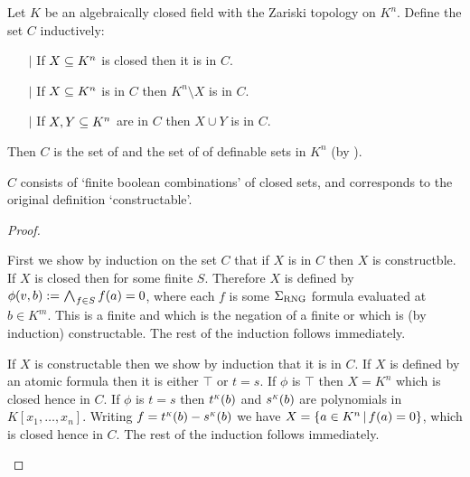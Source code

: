 \begin{prop}[Constructable]
    Let $K$ be an algebraically closed field with the Zariski topology on $K^n$.
    Define the set $C$ inductively:
    \begin{itemize}
        \item[$\vert$] If $X \subseteq K^n$ is closed then it is in $C$.
        \item[$\vert$] If $X \subseteq K^n$ is in $C$ then $K^n \setminus X$
        is in $C$. 
        \item[$\vert$] If $X,Y \subseteq K^n$ are in $C$ then $X \cup Y$
        is in $C$. 
    \end{itemize}
    Then $C$ is the set of  
    and  
    the set of of definable sets in $K^n$
    (by ).

    $C$ consists of `finite boolean combinations' of closed sets, 
    and corresponds to the original definition `constructable'.
\end{prop}
\begin{proof}
    \begin{forward}
        First we show by induction on the set $C$ 
        that if $X$ is in $C$ then $X$ is constructble.
        If $X$ is closed then 
         for some 
        finite $S$. 
        Therefore $X$ is defined by 
        $\phi(v,b) := \bigand{f \in S}{} f(a) = 0$,
        where each $f$ is some $\Sigma_{\mathrm{RNG}}$ formula evaluated at $b \in K^m$.
        This is a finite and which is the negation of a finite or which is 
        (by induction) constructable.
        The rest of the induction follows immediately.
    \end{forward}
    
    \begin{backward}
        If $X$ is constructable then we show by induction that it is in $C$.
        If $X$ is defined by an atomic formula then it is either $\top$ 
        or $t = s$. If $\phi$ is $\top$ then $X = K^n$ which is closed
        hence in $C$.
        If $\phi$ is $t = s$ then 
        $\modintp{K}{t}(b)$ and $\modintp{K}{s}(b)$ are polynomials
        in $K[x_1,\dots,x_n]$.
        Writing $f = \modintp{K}{t}(b) - \modintp{K}{s}(b)$
        we have $X = \left\{a \in K^n \,|\, f(a) = 0\right\}$,
        which is closed hence in $C$.
        The rest of the induction follows immediately.
    \end{backward}
\end{proof}

